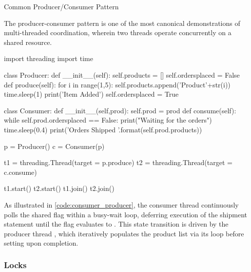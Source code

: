 \documentclass[10pt]{article}
\begin{document}
      \begin{core}{Common Producer/Consumer Pattern}

        The producer-consumer pattern is one of the most canonical demonstrations of multi-threaded coordination, wherein two threads operate concurrently on a shared resource.

        \begin{pyconsole}

          import threading
          import time

          class Producer:
              def __init__(self):
                  self.products = []
                  self.ordersplaced = False
              def produce(self):
                  for i in range(1,5):
                      self.products.append('Product'+str(i))
                      time.sleep(1)
                      print('Item Added')
                  self.ordersplaced = True

          class Consumer:
              def __init__(self,prod):
                  self.prod = prod
              def consume(self):
                  while self.prod.ordersplaced == False:
                      print("Waiting for the orders")
                      time.sleep(0.4)
                  print('Orders Shipped {}'.format(self.prod.products))

          p = Producer()
          c = Consumer(p)

          t1 = threading.Thread(target = p.produce)
          t2 = threading.Thread(target = c.consume)

          t1.start()
          t2.start()
          t1.join()
          t2.join()

        \end{pyconsole}

        As illustrated in \autoref{code:consumer_producer}, the consumer thread  continuously polls the shared  flag within a busy-wait loop, deferring execution of the shipment statement until the flag evaluates to . This state transition is driven by the producer thread , which iteratively populates the product list via its  loop before setting  upon completion.

      \end{core}

    \subsubsection{Locks}
\end{document}
